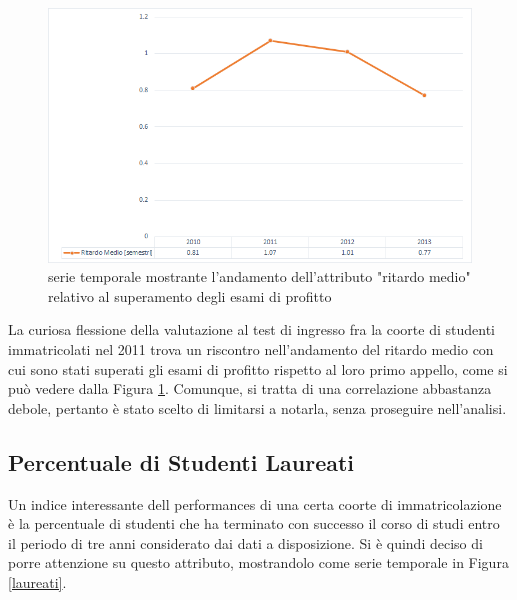    \begin{figure}
        \centering
        \caption{serie temporale mostrante l'andamento dell'attributo "ritardo medio" relativo al superamento degli esami di profitto}
        \label{ritardo}
        \includegraphics[scale=0.55]{../visual/stud_3.png}
    \end{figure}

    La curiosa flessione della valutazione al test di ingresso fra la coorte di studenti immatricolati nel 2011 trova un riscontro nell'andamento del ritardo medio con cui sono stati superati gli esami di profitto rispetto al loro primo appello, come si può vedere dalla Figura \ref{ritardo}. Comunque, si tratta di una correlazione abbastanza debole, pertanto è stato scelto di limitarsi a notarla, senza proseguire nell'analisi. \\

    \subsection{Percentuale di Studenti Laureati}

    Un indice interessante dell performances di una certa coorte di immatricolazione è la percentuale di studenti che ha terminato con successo il corso di studi entro il periodo di tre anni considerato dai dati a disposizione. Si è quindi deciso di porre attenzione su questo attributo, mostrandolo come serie temporale in Figura \ref{laureati}. \\

